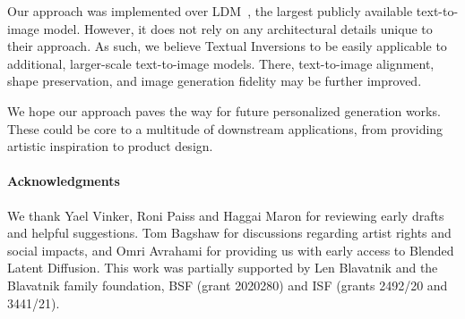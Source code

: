 Our approach was implemented over LDM~\citep{rombach2021highresolution}, the largest publicly available text-to-image model. However, it does not rely on any architectural details unique to their approach. As such, we believe Textual Inversions to be easily applicable to additional, larger-scale text-to-image models. There, text-to-image alignment, shape preservation, and image generation fidelity may be further improved.

We hope our approach paves the way for future personalized generation works. These could be core to a multitude of downstream applications, from providing artistic inspiration to product design. 

\paragraph{Acknowledgments} We thank Yael Vinker, Roni Paiss and Haggai Maron for reviewing early drafts and helpful suggestions. Tom Bagshaw for discussions regarding artist rights and social impacts, and Omri Avrahami for providing us with early access to Blended Latent Diffusion. This work was partially supported by Len Blavatnik and the Blavatnik family foundation, BSF (grant 2020280) and ISF (grants 2492/20 and 3441/21).


